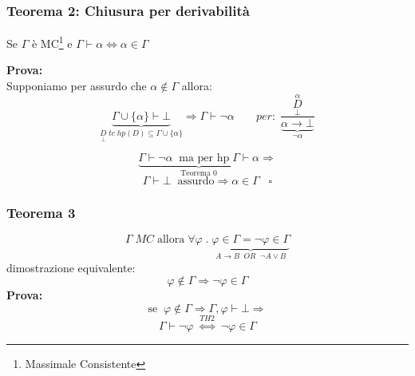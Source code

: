 \documentclass{article}
\theoremstyle{break}
\theoremstyle{break}
\theoremstyle{break}
\theoremstyle{break}
\begin{document}
\subsubsection{Teorema 2: Chiusura per derivabilità}
Se \( \Gamma \) è MC\footnote{Massimale Consistente} e \( \Gamma \vdash \alpha \Leftrightarrow \alpha \in \Gamma\) 


\textbf{Prova:}\\
Supponiamo per assurdo che \( \alpha \notin \Gamma \) allora:
\[ \underbrace{\Gamma \cup \{\alpha\} \vdash \bot}_{\underset{\bot}{D}\;tc\; hp(D) \subseteq \Gamma \cup \{\alpha\} } \Rightarrow \Gamma \vdash \neg \alpha \;\;\;\;\;\;\;per:\; \frac{\underset{\bot}{\stackrel{\alpha}{D}}}{\underbrace{\alpha \to \bot}_{\neg \alpha}} \] 

\[
  \underbrace{\Gamma \vdash \neg \alpha \;\; \text{ma per hp}\; \Gamma \vdash \alpha}_{\text{Teorema 0}} \Rightarrow
\] 
\[
  \Gamma \vdash \bot \;\; \text{assurdo} \Rightarrow \alpha \in \Gamma \;\;\; \square
\] 
\subsubsection{Teorema 3}
\[
  \Gamma\;MC\; \text{allora}\; \forall \varphi\;.\; \underbrace{\varphi \in \Gamma = \neg \varphi \in \Gamma}_{A \to B\;\;OR\;\; \neg A \vee B}
\]  
dimostrazione equivalente:
\[
  \varphi \notin \Gamma \Rightarrow \neg \varphi \in \Gamma
\] 
\textbf{Prova:}
\[
  \text{se}\;\; \varphi \notin \Gamma \Rightarrow \Gamma, \varphi \vdash \bot \Rightarrow
\] 
\[
  \Gamma \vdash \neg \varphi\; \stackrel{TH2}{\Leftrightarrow}\; \neg \varphi \in \Gamma
\] 
\end{document}
